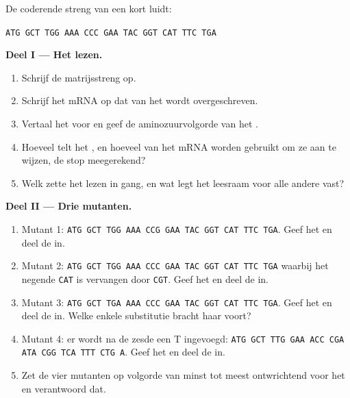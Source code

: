 \begin{problem}
\label{pb:g11:gene-expression:1}
De coderende streng van een kort  luidt:
\begin{center}
\texttt{ATG GCT TGG AAA CCC GAA TAC GGT CAT TTC TGA}
\end{center}

\medskip
\noindent\textbf{Deel I --- Het  lezen.}
\begin{enumerate}
  \item Schrijf de matrijsstreng op.
  \item Schrijf het mRNA op dat van het  wordt overgeschreven.
  \item Vertaal het  voor  en geef de aminozuurvolgorde van het
        .
  \item Hoeveel  telt het , en hoeveel  van het
        mRNA worden gebruikt om ze aan te wijzen, de stop meegerekend?
  \item Welk  zette het lezen in gang, en wat legt het leesraam voor
        alle andere vast?
\end{enumerate}

\medskip
\noindent\textbf{Deel II --- Drie mutanten.}
\begin{enumerate}[resume]
  \item Mutant 1: \texttt{ATG GCT TGG AAA CCG GAA TAC GGT CAT TTC TGA}.
        Geef het  en deel de  in.
  \item Mutant 2: \texttt{ATG GCT TGG AAA CCC GAA TAC GGT CAT TTC TGA}
        waarbij het negende  \texttt{CAT} is vervangen door
        \texttt{CGT}. Geef het  en deel de  in.
  \item Mutant 3: \texttt{ATG GCT TGA AAA CCC GAA TAC GGT CAT TTC TGA}.
        Geef het  en deel de  in. Welke enkele substitutie
        bracht haar voort?
  \item Mutant 4: er wordt na de zesde  een T ingevoegd:
        \texttt{ATG GCT TTG GAA ACC CGA ATA CGG TCA TTT CTG A}. Geef het
         en deel de  in.
  \item Zet de vier mutanten op volgorde van minst tot meest ontwrichtend
        voor het  en verantwoord dat.
\end{enumerate}


\end{problem}
